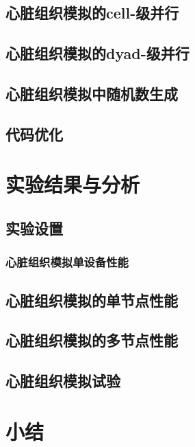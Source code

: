 \subsection{心脏组织模拟的cell-级并行}

\subsection{心脏组织模拟的dyad-级并行}

\subsection{心脏组织模拟中随机数生成}


\subsection{代码优化}



\section{实验结果与分析}
\subsection{实验设置}

\subsubsection{心脏组织模拟单设备性能}

\subsection{心脏组织模拟的单节点性能}

\subsection{心脏组织模拟的多节点性能}

\subsection{心脏组织模拟试验}

\section{小结}
